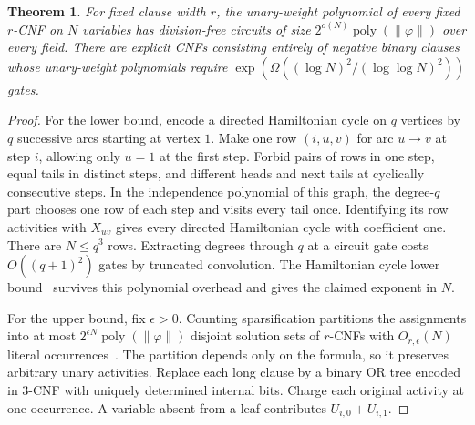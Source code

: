 \documentclass[11pt]{article}
\newtheorem{theorem}{Theorem}[section]
\theoremstyle{definition}
\begin{document}
\begin{theorem}\label{thm:total-vars}
For fixed clause width \(r\), the unary-weight polynomial of every fixed \(r\)-CNF on \(N\) variables has division-free circuits of size \(2^{o(N)}\operatorname{poly}(\|\varphi\|)\) over every field. There are explicit CNFs consisting entirely of negative binary clauses whose unary-weight polynomials require \(\exp(\Omega((\log N)^2/(\log\log N)^2))\) gates.
\end{theorem}
\begin{proof}
For the lower bound, encode a directed Hamiltonian cycle on \(q\) vertices by \(q\) successive arcs starting at vertex \(1\). Make one row \((i,u,v)\) for arc \(u\to v\) at step \(i\), allowing only \(u=1\) at the first step. Forbid pairs of rows in one step, equal tails in distinct steps, and different heads and next tails at cyclically consecutive steps. In the independence polynomial of this graph, the degree-\(q\) part chooses one row of each step and visits every tail once. Identifying its row activities with \(X_{uv}\) gives every directed Hamiltonian cycle with coefficient one. There are \(N\le q^3\) rows. Extracting degrees through \(q\) at a circuit gate costs \(O((q+1)^2)\) gates by truncated convolution. The Hamiltonian cycle lower bound~\cite[Theorem~1.1]{circuits} survives this polynomial overhead and gives the claimed exponent in \(N\).

For the upper bound, fix \(\epsilon>0\). Counting sparsification partitions the assignments into at most \(2^{\epsilon N}\operatorname{poly}(\|\varphi\|)\) disjoint solution sets of \(r\)-CNFs with \(O_{r,\epsilon}(N)\) literal occurrences~\cite[Lemma~A.1]{dell-sparsification}. The partition depends only on the formula, so it preserves arbitrary unary activities. Replace each long clause by a binary OR tree encoded in \(3\)-CNF with uniquely determined internal bits. Charge each original activity at one occurrence. A variable absent from a leaf contributes \(U_{i,0}+U_{i,1}\).


\end{proof}
\end{document}

